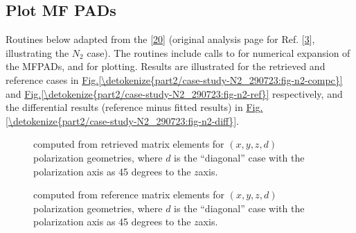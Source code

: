 \documentclass[letterpaper,table,10pt,english]{jupyterBook}
\begin{document}
\subsection{Plot MF PADs}
\label{\detokenize{part2/case-study-C2H4_290723:plot-mf-pads}}
\sphinxAtStartPar
Routines below adapted from the  {[}\hyperlink{cite.backmatter/bibliography:id681}{20}{]}  (original analysis page for Ref. {[}\hyperlink{cite.backmatter/bibliography:id686}{3}{]}, illustrating the \(N_2\) case). The routines include calls to  for numerical expansion of the MF\sphinxhyphen{}PADs, and  for plotting. Results are illustrated for the retrieved and reference cases in \hyperref[\detokenize{part2/case-study-N2_290723:fig-n2-compc}]{Fig.\@ \ref{\detokenize{part2/case-study-N2_290723:fig-n2-compc}}} and \hyperref[\detokenize{part2/case-study-N2_290723:fig-n2-ref}]{Fig.\@ \ref{\detokenize{part2/case-study-N2_290723:fig-n2-ref}}} respectively, and the differential results (reference minus fitted results) in \hyperref[\detokenize{part2/case-study-N2_290723:fig-n2-diff}]{Fig.\@ \ref{\detokenize{part2/case-study-N2_290723:fig-n2-diff}}}.

\begin{figure}[htbp]
\centering
\capstart

\noindent{}
\caption{{\hyperref[\detokenize{backmatter/glossary:term-MF}]{}} computed from retrieved matrix elements for \((x,y,z,d)\) polarization geometries, where \(d\) is the “diagonal” case with the polarization axis as 45 degrees to the \(z\)\sphinxhyphen{}axis.}\label{\detokenize{part2/case-study-C2H4_290723:fig-c2h4-compc}}\end{figure}

\begin{figure}[htbp]
\centering
\capstart

\noindent{}
\caption{{\hyperref[\detokenize{backmatter/glossary:term-MF}]{}} computed from reference  matrix elements for \((x,y,z,d)\) polarization geometries, where \(d\) is the “diagonal” case with the polarization axis as 45 degrees to the \(z\)\sphinxhyphen{}axis.}\label{\detokenize{part2/case-study-C2H4_290723:fig-c2h4-ref}}\end{figure}
\end{document}
